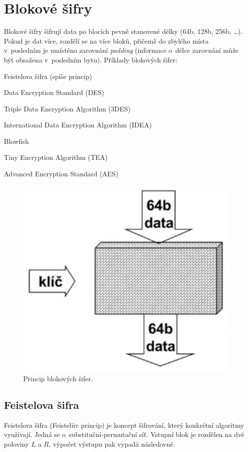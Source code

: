 
\section{Blokové šifry}

Blokové šifry šifrují data po blocích pevně stanovené délky (64b, 128b, 256b, \dots). Pokud je dat více, rozdělí se na více bloků, přičemž do zbylého místa v~posledním je umístěno zarovnání \textit{padding} (informace o~délce zarovnání může být obsažena v~posledním bytu). Příklady blokových šifer: \begin{compactitem}
    \item Feistelova šifra (spíše princip)
    \item Data Encryption Standard (DES)
    \item Triple Data Encryption Algorithm (3DES)
    \item International Data Encryption Algorithm (IDEA)
    \item Blowfish
    \item Tiny Encryption Algorithm (TEA)
    \item Advanced Encryption Standard (AES)
\end{compactitem}

\begin{figure}[H]
    \centering
    \includegraphics[width=0.35\linewidth]{symmetric_cryptography_blocks.png}
    \caption{Princip blokových šifer.}
\end{figure}

\subsection{Feistelova šifra}

Feistelova šifra (Feistelův princip) je koncept šifrování, který konkrétní algoritmy využívají. Jedná se o~substituční-permutační síť. Vstupní blok je rozdělen na dvě poloviny $L$ a $R$, výpočet výstupu pak vypadá následovně.

